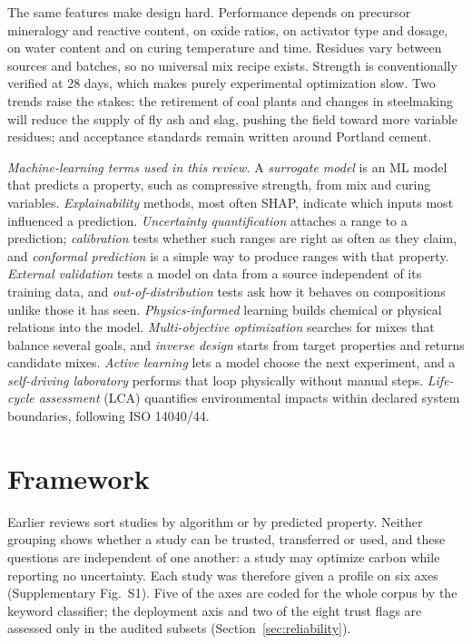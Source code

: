 \documentclass[pdflatex,sn-basic]{sn-jnl}
\begin{document}
The same features make design hard. Performance depends on precursor mineralogy and reactive content, on oxide ratios, on activator type and dosage, on water content and on curing temperature and time. Residues vary between sources and batches, so no universal mix recipe exists. Strength is conventionally verified at 28 days, which makes purely experimental optimization slow. Two trends raise the stakes: the retirement of coal plants and changes in steelmaking will reduce the supply of fly ash and slag, pushing the field toward more variable residues; and acceptance standards remain written around Portland cement.

\emph{Machine-learning terms used in this review.} A \emph{surrogate model} is an ML model that predicts a property, such as compressive strength, from mix and curing variables. \emph{Explainability} methods, most often SHAP, indicate which inputs most influenced a prediction. \emph{Uncertainty quantification} attaches a range to a prediction; \emph{calibration} tests whether such ranges are right as often as they claim, and \emph{conformal prediction} is a simple way to produce ranges with that property. \emph{External validation} tests a model on data from a source independent of its training data, and \emph{out-of-distribution} tests ask how it behaves on compositions unlike those it has seen. \emph{Physics-informed} learning builds chemical or physical relations into the model. \emph{Multi-objective optimization} searches for mixes that balance several goals, and \emph{inverse design} starts from target properties and returns candidate mixes. \emph{Active learning} lets a model choose the next experiment, and a \emph{self-driving laboratory} performs that loop physically without manual steps. \emph{Life-cycle assessment} (LCA) quantifies environmental impacts within declared system boundaries, following ISO 14040/44.

\section{Framework}\label{sec:framework}

Earlier reviews sort studies by algorithm or by predicted property. Neither grouping shows whether a study can be trusted, transferred or used, and these questions are independent of one another: a study may optimize carbon while reporting no uncertainty. Each study was therefore given a profile on six axes (Supplementary Fig.~S1). Five of the axes are coded for the whole corpus by the keyword classifier; the deployment axis and two of the eight trust flags are assessed only in the audited subsets (Section~\ref{sec:reliability}).
\end{document}
